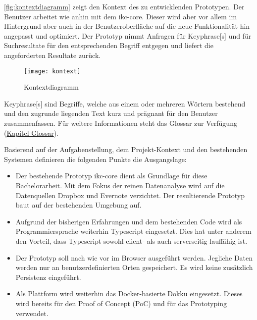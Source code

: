 \autoref{fig:kontextdiagramm} zeigt den Kontext des zu entwicklenden Prototypen. Der Benutzer arbeitet wie anhin mit dem \gls{ikc-core}. Dieser wird aber vor allem im Hintergrund aber auch in der Benutzeroberfläche auf die neue Funktionalität hin angepasst und optimiert. Der Prototyp nimmt Anfragen für \gls{Keyphrase}[s] und für Suchresultate für den entsprechenden Begriff entgegen und liefert die angeforderten Resultate zurück.

\begin{figure}[H]
\centering
\texttt{[image: kontext]}
\caption{Kontextdiagramm}
\label{fig:kontextdiagramm}
\end{figure}

\gls{Keyphrase}[s] sind Begriffe, welche aus einem oder mehreren Wörtern bestehend und den zugrunde liegenden Text kurz und prägnant für den Benutzer zusammenfassen. Für weitere Informationen steht das Glossar zur Verfügung (\hyperref[glossar]{Kapitel Glossar}).

Basierend auf der Aufgabenstellung, dem Projekt-Kontext und den bestehenden Systemen definieren die folgenden Punkte die Ausgangslage:
\begin{itemize}
    \item Der bestehende Prototyp \gls{ikc-core} dient als Grundlage für diese Bachelorarbeit. Mit dem Fokus der reinen Datenanalyse wird auf die Datenquellen Dropbox und Evernote verzichtet. Der resultierende Prototyp baut auf der bestehenden Umgebung auf.
    \item Aufgrund der bisherigen Erfahrungen und dem bestehenden Code wird als Programmiersprache weiterhin \gls{Typescript} eingesetzt. Dies hat unter anderem den Vorteil, dass \gls{Typescript} sowohl client- als auch serverseitig lauffähig ist.
    \item Der Prototyp soll nach wie vor im Browser ausgeführt werden. Jegliche Daten werden nur an benutzerdefinierten Orten gespeichert. Es wird keine zusätzlich Persistenz eingeführt.
    \item Als Plattform wird weiterhin das Docker-basierte \gls{Dokku} eingesetzt. Dieses wird bereits für den Proof of Concept (\gls{PoC}) und für das Prototyping verwendet.
\end{itemize}

